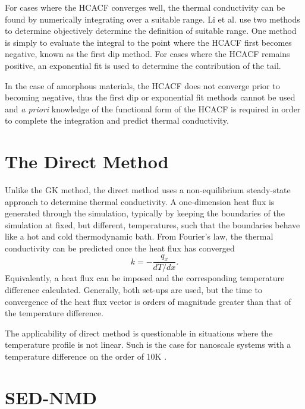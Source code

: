 \documentclass[aps,prb,preprint,preprintnumbers,amsmath,amssymb,floatfix,superscriptaddress]{revtex4}
\begin{document}
For cases where the HCACF converges well, the thermal conductivity can be found by numerically integrating over a suitable range. Li et al. \cite{Li1998139} use two methods to determine objectively determine the definition of suitable range. One method is simply to evaluate the integral to the point where the HCACF first becomes negative, known as the first dip method. For cases where the HCACF remains positive, an exponential fit is used to determine the contribution of the tail.

In the case of amorphous materials, the HCACF does not converge prior to becoming negative, thus the first dip or exponential fit methods cannot be used and \textit{a priori} knowledge of the functional form of the HCACF is required in order to complete the integration and predict thermal conductivity.

\section*{The Direct Method}

Unlike the GK method, the direct method uses a non-equilibrium steady-state approach to determine thermal conductivity. A one-dimension heat flux is generated through the simulation, typically by keeping the boundaries of the simulation at fixed, but different, temperatures, such that the boundaries behave like a hot and cold thermodynamic bath. From Fourier's law, the thermal conductivity can be predicted once the heat flux has converged
%
\begin{equation}
k=-\frac{q_x}{dT/dx}.
\end{equation}
%
Equivalently, a heat flux can be imposed and the corresponding temperature difference calculated. Generally, both set-ups are used, but the time to convergence of the heat flux vector is orders of magnitude greater than that of the temperature difference.

The applicability of direct method is questionable in situations where the temperature profile is not linear. Such is the case for nanoscale systems with a temperature difference on the order of 10K \cite{mcgaugheythesis}.

\section*{SED-NMD}
\end{document}
